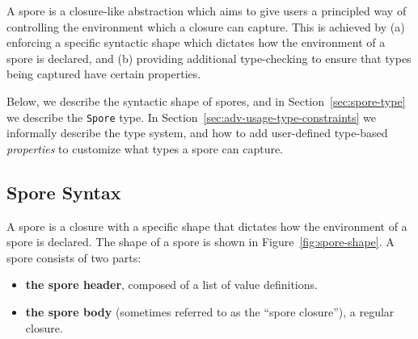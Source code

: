 \documentclass{llncs}
\begin{document}

A spore is a closure-like abstraction which aims to give users a principled way
of controlling the environment which a closure can capture. This is achieved
by (a) enforcing a specific syntactic shape which dictates how the environment
of a spore is declared, and (b) providing additional type-checking to ensure
that types being captured have certain properties.




Below, we describe the syntactic shape of spores, and in
Section~\ref{sec:spore-type} we describe the \verb|Spore| type.
In Section~\ref{sec:adv-usage-type-constraints} we informally describe the type
system, and how to add user-defined type-based {\em properties} to
customize what types a spore can capture.

\vspace{1mm}
\subsection{Spore Syntax}
\label{sec:spore-syntax}

A spore is a closure with a specific shape that dictates how the environment
of a spore is declared. The shape of a spore is shown in Figure~\ref{fig:spore-shape}.
A spore consists of two parts:
\vspace{-1.5mm}
\begin{itemize}
\item {\bf the spore header}, composed of a list of value definitions.
\item {\bf the spore body} (sometimes referred to as the ``spore closure''), a regular closure.
\end{itemize}
\end{document}
